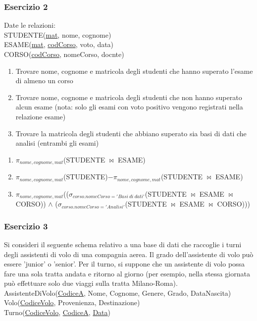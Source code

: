 \documentclass[a4paper]{article}
\begin{document}
\subsubsection{Esercizio 2}
Date le relazioni:\medskip\\
STUDENTE(\underline{mat}, nome, cognome)\\
ESAME(\underline{mat}, \underline{codCorso}, voto, data)\\
CORSO(\underline{codCorso}, nomeCorso, docnte)

\begin{enumerate}
  \item Trovare nome, cognome e matricola degli studenti che hanno superato l'esame di almeno un corso
  \item Trovare nome, cognome e matricola degli studenti che non hanno superato alcun esame (nota: solo gli esami con voto positivo vengono registrati nella relazione esame)
  \item Trovare la matricola degli studenti che abbiano superato sia basi di dati che analisi (entrambi gli esami)
\end{enumerate}

\begin{mybox}{}
\begin{enumerate}
  \item $\pi_{nome, cognome, mat}$(STUDENTE $\Join$ ESAME)
  \item $\pi_{nome, cognome, mat}$(STUDENTE)$- \pi_{nome, cognome, mat}$(STUDENTE $\Join$ ESAME)
  \item $\pi_{nome, cognome, mat}$(($\sigma_{corso.nomeCorso='Basi\ di\ dati'}$(STUDENTE $\Join$ ESAME $\Join$ CORSO)) $\land$ ($\sigma_{corso.nomeCorso='Analisi'}$(STUDENTE $\Join$ ESAME $\Join$ CORSO)))
\end{enumerate}
\end{mybox}

\subsubsection{Esercizio 3}
Si consideri il seguente schema  relativo a una base di dati che raccoglie i turni degli assistenti di volo di una compagnia aerea. Il grado dell'assistente di volo può essere 'junior' o 'senior'. Per il turno, si suppone che un assistente di volo possa fare una sola tratta andata e ritorno al giorno (per esempio, nella stessa giornata può effettuare solo due viaggi sulla tratta Milano-Roma).\medskip\\
AssistenteDiVolo(\underline{CodiceA}, Nome, Cognome, Genere, Grado, DataNascita)\\
Volo(\underline{CodiceVolo}, Provenienza, Destinazione)\\
Turno(\underline{CodiceVolo}, \underline{CodiceA}, \underline{Data})
\end{document}

